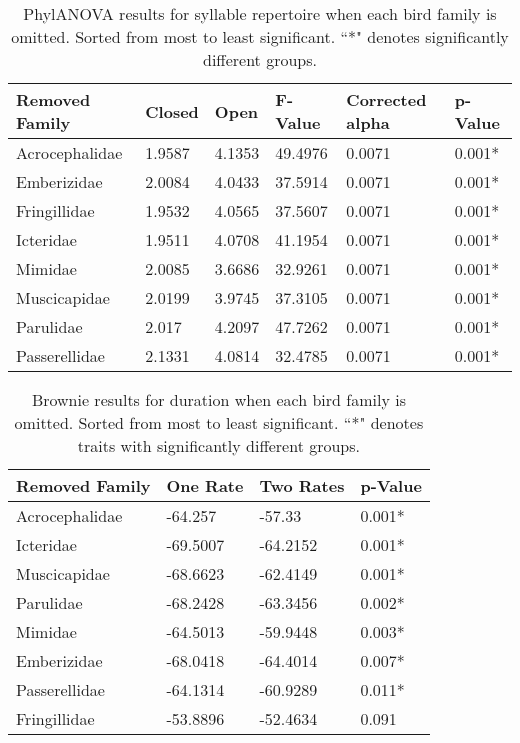 \documentclass[a4paper,12pt]{article}
\begin{document}
\begin{table}[ht]
\caption{PhylANOVA results for syllable repertoire when each bird family is omitted.  Sorted from most to least significant.  ``*" denotes significantly different groups.}
\centering
\begin{tabular}{llllll}
  \hline
Removed Family & Closed & Open & F-Value & Corrected alpha & p-Value \\ 
  \hline
Acrocephalidae & 1.9587 & 4.1353 & 49.4976 & 0.0071 & 0.001* \\ 
  Emberizidae & 2.0084 & 4.0433 & 37.5914 & 0.0071 & 0.001* \\ 
  Fringillidae & 1.9532 & 4.0565 & 37.5607 & 0.0071 & 0.001* \\ 
  Icteridae & 1.9511 & 4.0708 & 41.1954 & 0.0071 & 0.001* \\ 
  Mimidae & 2.0085 & 3.6686 & 32.9261 & 0.0071 & 0.001* \\ 
  Muscicapidae & 2.0199 & 3.9745 & 37.3105 & 0.0071 & 0.001* \\ 
  Parulidae & 2.017 & 4.2097 & 47.7262 & 0.0071 & 0.001* \\ 
  Passerellidae & 2.1331 & 4.0814 & 32.4785 & 0.0071 & 0.001* \\ 
   \hline
\end{tabular}
\end{table}

\begin{table}[ht]
\caption{Brownie results for duration when each bird family is omitted.  Sorted from most to least significant.  ``*" denotes traits with significantly different groups.}
\centering
\begin{tabular}{llll}
  \hline
Removed Family & One Rate & Two Rates & p-Value \\ 
  \hline
Acrocephalidae & -64.257 & -57.33 & 0.001* \\ 
  Icteridae & -69.5007 & -64.2152 & 0.001* \\ 
  Muscicapidae & -68.6623 & -62.4149 & 0.001* \\ 
  Parulidae & -68.2428 & -63.3456 & 0.002* \\ 
  Mimidae & -64.5013 & -59.9448 & 0.003* \\ 
  Emberizidae & -68.0418 & -64.4014 & 0.007* \\ 
  Passerellidae & -64.1314 & -60.9289 & 0.011* \\ 
  Fringillidae & -53.8896 & -52.4634 & 0.091 \\ 
   \hline
\end{tabular}
\end{table}
\end{document}
